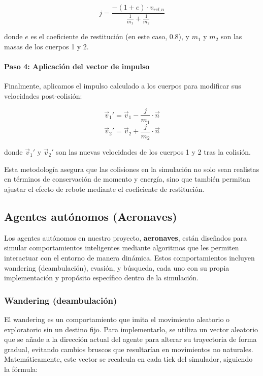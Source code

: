 \begin{equation}
\label{eq7}
    j = \frac{-(1 + e) \cdot v_{rel\_n}}{\frac{1}{m_1} + \frac{1}{m_2}}
\end{equation}

donde \(e\) es el coeficiente de restitución (en este caso, 0.8), y \(m_1\) y \(m_2\) son las masas de los cuerpos 1 y 2.

\paragraph{Paso 4: Aplicación del vector de impulso}
Finalmente, aplicamos el impulso calculado a los cuerpos para modificar sus velocidades post-colisión:

\begin{equation}
\label{eq8}
    \vec{v}_1' = \vec{v}_1 - \frac{j}{m_1} \cdot \vec{n}
\end{equation}
\begin{equation}
\label{eq9}
    \vec{v}_2' = \vec{v}_2 + \frac{j}{m_2} \cdot \vec{n}
\end{equation}

donde \(\vec{v}_1'\) y \(\vec{v}_2'\) son las nuevas velocidades de los cuerpos 1 y 2 tras la colisión.

Esta metodología asegura que las colisiones en la simulación no solo sean realistas en términos de conservación de momento y energía, sino que también permitan ajustar el efecto de rebote mediante el coeficiente de restitución.

\subsection{Agentes autónomos (Aeronaves)}

Los agentes autónomos en nuestro proyecto, \textbf{aeronaves}, están diseñados para simular comportamientos inteligentes mediante algoritmos que les permiten interactuar con el entorno de manera dinámica. Estos comportamientos incluyen wandering (deambulación), evasión, y búsqueda, cada uno con su propia implementación y propósito específico dentro de la simulación.

\subsubsection{Wandering (deambulación)}
El wandering es un comportamiento que imita el movimiento aleatorio o exploratorio sin un destino fijo. Para implementarlo, se utiliza un vector aleatorio que se añade a la dirección actual del agente para alterar su trayectoria de forma gradual, evitando cambios bruscos que resultarían en movimientos no naturales. Matemáticamente, este vector se recalcula en cada tick del simulador, siguiendo la fórmula:

